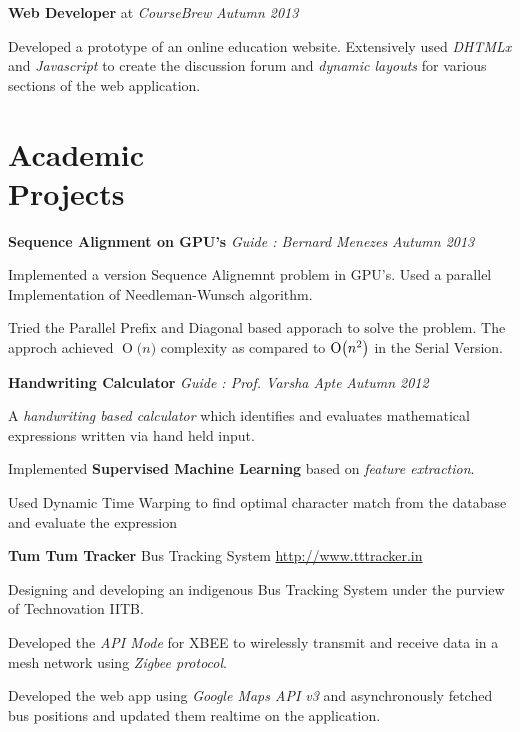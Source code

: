 \documentclass[margin,11pt]{resume}
\newcommand{\BigO}[1]{\ensuremath{\operatorname{O}\bigl(#1\bigr)}}
\begin{document}
\begin{resume}
\textbf{Web Developer} at \emph{CourseBrew} \hfill \emph{Autumn 2013} 
\begin{list2}
\item Developed a prototype of an online education website. Extensively used \emph{DHTMLx} and \emph{Javascript} to create the discussion forum and \emph{dynamic layouts} for various sections of the web application.
\end{list2}


\section{\mysidestyle Academic\\Projects}

\textbf{Sequence Alignment on GPU's} \hfill
\textsl{Guide : Bernard Menezes} \hfill \emph{Autumn 2013}
\begin{list2}
\item Implemented a version Sequence Alignemnt problem in GPU’s. Used a parallel
Implementation of Needleman-Wunsch algorithm.
\item Tried the Parallel Prefix and Diagonal based apporach to solve the problem. The
approch achieved \BigO{n} complexity as compared to \BigO{n\textsuperscript{2}} in the Serial Version.
\end{list2}


\textbf{Handwriting Calculator} \hfill
    \textsl{Guide : Prof. Varsha Apte} \hfill \emph{Autumn 2012}
\begin{list2}
\item A\emph{ handwriting based calculator} which identifies and evaluates mathematical expressions written via hand held input.
\item Implemented \textbf{Supervised Machine Learning} based on \emph{feature extraction}. 
\item Used Dynamic Time Warping to find optimal character match from the database and evaluate the expression
\end{list2}

\textbf{Tum Tum Tracker} \hfill Bus Tracking System \hfill
    \url{http://www.tttracker.in}
\begin{list2}
\item Designing and developing an indigenous Bus Tracking System under the purview of Technovation IITB.
\item Developed the \emph{API Mode} for XBEE to wirelessly transmit and receive data in a mesh network using \emph{Zigbee protocol}.
\item Developed the web app using \emph{Google Maps API v3} and asynchronously fetched bus positions and updated them realtime  on the application.
\end{list2}



\end{resume}
\end{document}
